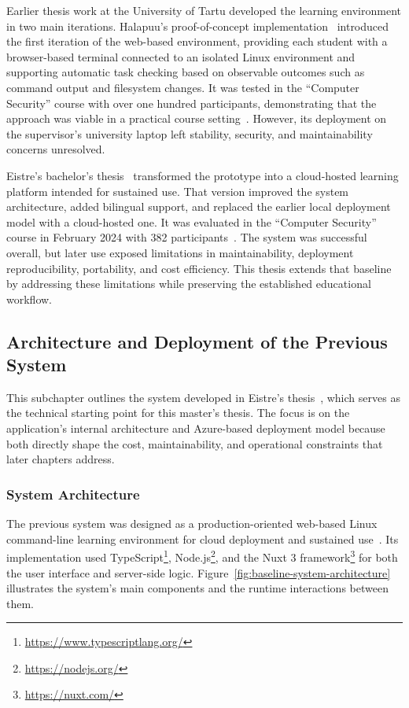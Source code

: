 Earlier thesis work at the University of Tartu developed the learning environment in two main iterations.
Halapuu's proof-of-concept implementation~\cite{halapuu_2022} introduced the first iteration of the web-based environment, providing each student with a browser-based terminal connected to an isolated Linux environment and supporting automatic task checking based on observable outcomes such as command output and filesystem changes.
It was tested in the ``Computer Security'' course with over one hundred participants, demonstrating that the approach was viable in a practical course setting~\cite{halapuu_2022}.
However, its deployment on the supervisor's university laptop left stability, security, and maintainability concerns unresolved.

Eistre's bachelor's thesis~\cite{eistre_2024} transformed the prototype into a cloud-hosted learning platform intended for sustained use.
That version improved the system architecture, added bilingual support, and replaced the earlier local deployment model with a cloud-hosted one.
It was evaluated in the ``Computer Security'' course in February 2024 with 382 participants~\cite{eistre_2024}.
The system was successful overall, but later use exposed limitations in maintainability, deployment reproducibility, portability, and cost efficiency.
This thesis extends that baseline by addressing these limitations while preserving the established educational workflow.

\subsection{Architecture and Deployment of the Previous System} \label{subsec:architecture-and-deployment-of-the-previous-system}
This subchapter outlines the system developed in Eistre's thesis~\cite{eistre_2024}, which serves as the technical starting point for this master's thesis.
The focus is on the application's internal architecture and Azure-based deployment model because both directly shape the cost, maintainability, and operational constraints that later chapters address.

\subsubsection{System Architecture} \label{subsubsec:system-architecture}
The previous system was designed as a production-oriented web-based Linux command-line learning environment for cloud deployment and sustained use~\cite{eistre_2024}.
Its implementation used TypeScript\footnote{\url{https://www.typescriptlang.org/}}, Node.js\footnote{\url{https://nodejs.org/}}, and the Nuxt 3 framework\footnote{\url{https://nuxt.com/}} for both the user interface and server-side logic.
Figure~\ref{fig:baseline-system-architecture} illustrates the system's main components and the runtime interactions between them.

